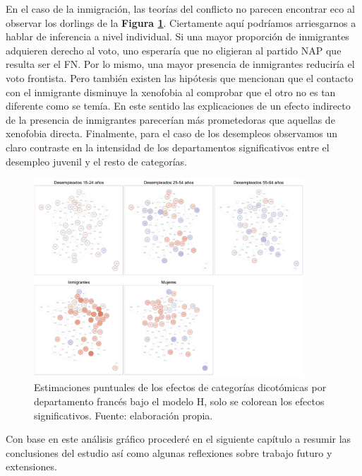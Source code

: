 En el caso de la inmigración, las teorías del conflicto no parecen encontrar eco al observar los dorlings de la \textbf{Figura \ref{fig:Dorling_Efectos_Dicotom}}. Ciertamente aquí podríamos arriesgarnos a hablar de inferencia a nivel individual. Si una mayor proporción de inmigrantes adquieren derecho al voto, uno esperaría que no eligieran al partido NAP que resulta ser el FN. Por lo mismo, una mayor presencia de inmigrantes reduciría el voto frontista. Pero también existen las hipótesis que mencionan que el contacto con el inmigrante disminuye la xenofobia al comprobar que el otro no es tan diferente como se temía. En este sentido las explicaciones de un efecto indirecto de la presencia de inmigrantes parecerían más prometedoras que aquellas de xenofobia directa. Finalmente, para el caso de los desempleos observamos un claro contraste en la intensidad de los departamentos significativos entre el desempleo juvenil y el resto de categorías.\\ 

\begin{figure}
	\centering
	\includegraphics[width = 0.9\textwidth]{Figs/Efectos/Dorling_Efectos_Dicotom_Modelo_H}
	\caption{Estimaciones puntuales de los efectos de categorías dicotómicas por departamento francés bajo el modelo H, solo se colorean los efectos significativos. Fuente: elaboración propia.}
	\label{fig:Dorling_Efectos_Dicotom}
\end{figure}

Con base en este análisis gráfico procederé en el siguiente capítulo a resumir las conclusiones del estudio así como algunas reflexiones sobre trabajo futuro y extensiones. 